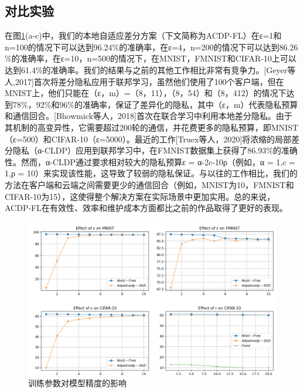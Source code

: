 \subsection{对比实验}
在图\ref{fig:[a-c]: 隐私预算对模型准确率的影响; [d]: 参数r对模型准确率的影响}(a-c)中，我们的本地自适应差分方案（下文简称为ACDP-FL）在ε=1和n=100的情况下可以达到96.24$\%$的准确率，在ε=4，n=200的情况下可以达到86.26$\%$的准确率，在ε=10，n=500的情况下，在MNIST，FMNIST和CIFAR-10上可以达到61.4$\%$的准确率。我们的结果与之前的其他工作相比非常有竞争力。[Geyer等人,2017]首次将差分隐私应用于联邦学习，虽然他们使用了100个客户端，但在MNIST上，他们只能在（ε，m）=（8，11），（8，54）和（8，412）的情况下达到78$\%$，92$\%$和96$\%$的准确率，保证了差异化的隐私，其中（ε，m）代表隐私预算和通信回合。[Bhowmick等人，2018]首次在联合学习中利用本地差分隐私。由于其机制的高变异性，它需要超过200轮的通信，并花费更多的隐私预算，即MNIST（ε=500）和CIFAR-10（ε=5000）。最近的工作[Truex等人，2020]将浓缩的局部差分隐私（α-CLDP）应用到联邦学习中，在FMNIST数据集上获得了86.93$\%$的准确性。然而，α-CLDP通过要求相对较大的隐私预算ε = α-2c-10ρ（例如，α = 1,c = 1,ρ = 10）来实现该性能，这导致了较弱的隐私保证。与以往的工作相比，我们的方法在客户端和云端之间需要更少的通信回合（例如，MNIST为10，FMNIST和CIFAR-10为15），这使得整个解决方案在实际场景中更加实用。总的来说，ACDP-FL在有效性、效率和维护成本方面都比之前的作品取得了更好的表现。

\begin{figure}[!hbt]
\centering
  	\includegraphics[scale=0.4]{fig2/C5/自适应差分对比实验}%
	\caption{训练参数对模型精度的影响}
  	\label{fig:[a-c]: 隐私预算对模型准确率的影响; [d]: 参数r对模型准确率的影响} 
\end{figure}

